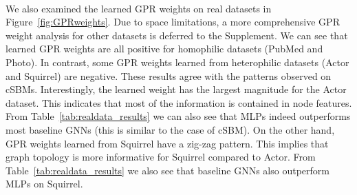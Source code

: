 \documentclass{article} \usepackage{iclr2021_conference,times}
\begin{document}
\begin{figure*}[t]
  \centering
  \vspace{-0.5cm}
  \\
  \vspace{-0.2cm}
  \vspace{-0.2cm}
  \caption{ Figures (a)-(d) show the learned GPR weights of our GPR-GNN method with random initialization on various datasets, for dense splitting. Figures (e)-(f) show the learned weights of our GPR-GNN method with initialization  on cSBM, for dense splitting. The shaded region indicates a  confidence interval.}\label{fig:GPRweights}
  \vspace{-0.4cm}
\end{figure*}

We also examined the learned GPR weights on real datasets in Figure~\ref{fig:GPRweights}. Due to space limitations, a more comprehensive GPR weight analysis for other datasets is deferred to the Supplement. We can see that learned GPR weights are all positive for homophilic datasets (PubMed and Photo). In contrast, some GPR weights learned from heterophilic datasets (Actor and Squirrel) are negative. These results agree with the patterns observed on cSBMs. Interestingly, the learned weight  has the largest magnitude for the Actor dataset. This indicates that most of the information is contained in node features. From Table~\ref{tab:realdata_results} we can also see that MLPs indeed outperforms most baseline GNNs (this is similar to the case of cSBM). On the other hand, GPR weights learned from Squirrel have a zig-zag pattern. This implies that graph topology is more informative for Squirrel compared to Actor. From Table~\ref{tab:realdata_results} we also see that baseline GNNs also outperform MLPs on Squirrel.
\end{document}
